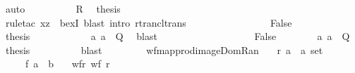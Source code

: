 \begin{isabellebody}
\ auto\isanewline
\ \ \ \ \ \ \ \ \isamarkupfalse%
\ R\ \isamarkupfalse%
\ {\isacharquery}{\kern0pt}thesis\isanewline
\ \ \ \ \ \ \ \ \ \ \isamarkupfalse%
\ {\isacharparenleft}{\kern0pt}rule{\isacharunderscore}{\kern0pt}tac\ x{\isacharequal}{\kern0pt}{\isachardoublequoteopen}z{\isachardoublequoteclose}\ \ bexI{\isacharparenright}{\kern0pt}\ {\isacharparenleft}{\kern0pt}blast\ intro{\isacharcolon}{\kern0pt}\ rtrancl{\isacharunderscore}{\kern0pt}trans{\isacharparenright}{\kern0pt}\isanewline
\ \ \ \ \ \ \isamarkupfalse%
\isanewline
\ \ \ \ \ \ \ \ \isamarkupfalse%
\ False\isanewline
\ \ \ \ \ \ \ \ \isamarkupfalse%
\ \isamarkupfalse%
\ {\isacharquery}{\kern0pt}thesis\isanewline
\ \ \ \ \ \ \ \ \ \ \isamarkupfalse%
\ a\ {\isacartoucheopen}a\ {\isasymin}\ Q{\isacartoucheclose}\ \isamarkupfalse%
\ blast\isanewline
\ \ \ \ \ \ \isamarkupfalse%
\isanewline
\ \ \ \ \isamarkupfalse%
\isanewline
\ \ \ \ \ \ \isamarkupfalse%
\ False\isanewline
\ \ \ \ \ \ \isamarkupfalse%
\ a\ {\isacartoucheopen}a\ {\isasymin}\ Q{\isacartoucheclose}\ \isamarkupfalse%
\ {\isacharquery}{\kern0pt}thesis\isanewline
\ \ \ \ \ \ \ \ \isamarkupfalse%
\ blast\isanewline
\ \ \ \ \isamarkupfalse%
\isanewline
\ \ \isamarkupfalse%
\isanewline
{}\isamarkupfalse%
%
\endisatagproof
{\isafoldproof}%
%
\isadelimproof
%
\endisadelimproof
%
\isadelimdocument
%
\endisadelimdocument
%
\isatagdocument
%
\isamarkuptrue%
%
\endisatagdocument
{\isafolddocument}%
%
\isadelimdocument
%
\endisadelimdocument
{}\isamarkupfalse%
\ wf{\isacharunderscore}{\kern0pt}map{\isacharunderscore}{\kern0pt}prod{\isacharunderscore}{\kern0pt}image{\isacharunderscore}{\kern0pt}Dom{\isacharunderscore}{\kern0pt}Ran{\isacharcolon}{\kern0pt}\isanewline
\ \ \ r{\isacharcolon}{\kern0pt}{\isacharcolon}{\kern0pt}\ {\isachardoublequoteopen}{\isacharparenleft}{\kern0pt}{\isacharprime}{\kern0pt}a\ {\isasymtimes}\ {\isacharprime}{\kern0pt}a{\isacharparenright}{\kern0pt}\ set{\isachardoublequoteclose}\isanewline
\ \ \ \ \ f{\isacharcolon}{\kern0pt}{\isacharcolon}{\kern0pt}\ {\isachardoublequoteopen}{\isacharprime}{\kern0pt}a\ {\isasymRightarrow}\ {\isacharprime}{\kern0pt}b{\isachardoublequoteclose}\isanewline
\ \ \ wf{\isacharunderscore}{\kern0pt}r{\isacharcolon}{\kern0pt}\ {\isachardoublequoteopen}wf\ r{\isachardoublequoteclose}\isanewline

\end{isabellebody}
